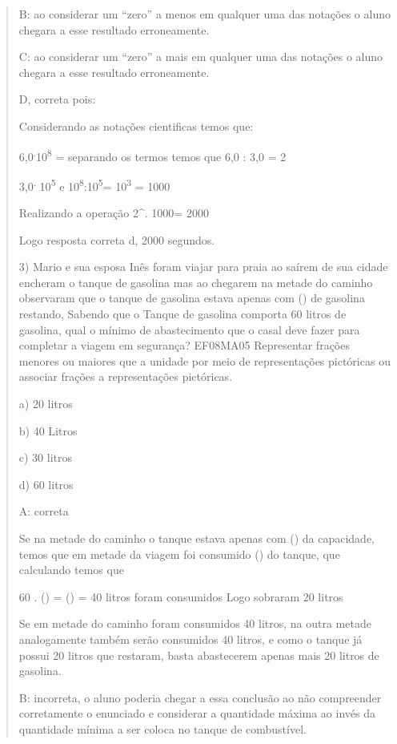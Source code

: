 \begin{quote}
\begin{escolha}
B: ao considerar um ``zero'' a menos em qualquer uma das notações o
aluno chegara a esse resultado erroneamente.

C: ao considerar um ``zero'' a mais em qualquer uma das notações o aluno
chegara a esse resultado erroneamente.

D, correta pois:

Considerando as notações cientificas temos que:

6,0\textsuperscript{.}10\textsuperscript{8} = separando os termos temos
que 6,0 : 3,0 = 2

3,0\textsuperscript{.} 10\textsuperscript{5} e
10\textsuperscript{8}:10\textsuperscript{5}= 10\textsuperscript{3} =
1000

Realizando a operação 2^{.} 1000= 2000

Logo resposta correta d, 2000 segundos.

3) Mario e sua esposa Inês foram viajar para praia ao saírem de sua
cidade encheram o tanque de gasolina mas ao chegarem na metade do
caminho observaram que o tanque de gasolina estava apenas com
() de gasolina restando, Sabendo que o Tanque de gasolina
comporta 60 litros de gasolina, qual o mínimo de abastecimento que o
casal deve fazer para completar a viagem em segurança? EF08MA05
Representar frações menores ou maiores que a unidade por meio de
representações pictóricas ou associar frações a representações
pictóricas.

a) 20 litros

b) 40 Litros

c) 30 litros

d) 60 litros

A: correta

Se na metade do caminho o tanque estava apenas com () da
capacidade, temos que em metade da viagem foi consumido ()
do tanque, que calculando temos que

60 . () = () = 40 litros foram consumidos
Logo sobraram 20 litros

Se em metade do caminho foram consumidos 40 litros, na outra metade
analogamente também serão consumidos 40 litros, e como o tanque já
possui 20 litros que restaram, basta abastecerem apenas mais 20 litros
de gasolina.

B: incorreta, o aluno poderia chegar a essa conclusão ao não compreender
corretamente o enunciado e considerar a quantidade máxima ao invés da
quantidade mínima a ser coloca no tanque de combustível.


\end{escolha}
\end{quote}
